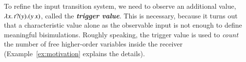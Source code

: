 \noi To refine the input transition system, we need to observe 
an additional value, 
$\lambda {x}.\,t ? (y) . (y\, {{x}})$, 
called the {\bf\em trigger value}. 
This is necessary, because it turns out
that a characteristic value 
alone as the observable input 
is not enough to define meaningful bisimulations.
Roughly speaking, the trigger value is used 
to {\em count} the number of free higher-order variables inside 
the receiver (Example~\ref{ex:motivation} explains the details). 

